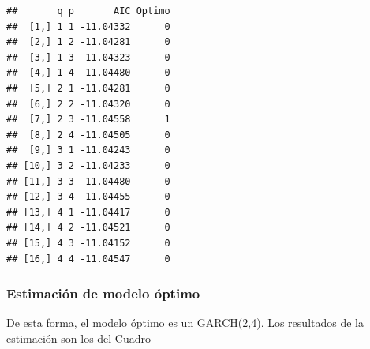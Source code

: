 \documentclass[
]{book}
\begin{document}
\begin{verbatim}
##       q p       AIC Optimo
##  [1,] 1 1 -11.04332      0
##  [2,] 1 2 -11.04281      0
##  [3,] 1 3 -11.04323      0
##  [4,] 1 4 -11.04480      0
##  [5,] 2 1 -11.04281      0
##  [6,] 2 2 -11.04320      0
##  [7,] 2 3 -11.04558      1
##  [8,] 2 4 -11.04505      0
##  [9,] 3 1 -11.04243      0
## [10,] 3 2 -11.04233      0
## [11,] 3 3 -11.04480      0
## [12,] 3 4 -11.04455      0
## [13,] 4 1 -11.04417      0
## [14,] 4 2 -11.04521      0
## [15,] 4 3 -11.04152      0
## [16,] 4 4 -11.04547      0
\end{verbatim}

\hypertarget{estimaciuxf3n-de-modelo-uxf3ptimo}{%
\subsubsection{Estimación de modelo óptimo}\label{estimaciuxf3n-de-modelo-uxf3ptimo}}

De esta forma, el modelo óptimo es un GARCH(2,4). Los resultados de la estimación son los del Cuadro
\end{document}
